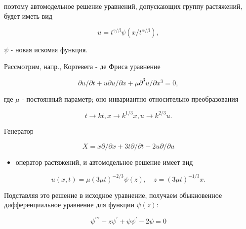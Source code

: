 \documentclass[10pt]{article}
\begin{document}
поэтому автомодельное решение уравнений, допускающих группу растяжений, будет иметь вид



\[

u=t^{\gamma / \beta} \psi\left(x / t^{\alpha / \beta}\right),

\]



$\psi$ - новая искомая функция.



Рассмотрим, напр., Кортевега - де Фриса уравнение



\[

\partial u / \partial t+u \partial u / \partial x+\mu \partial^{3} u / \partial x^{3}=0,

\]



где $\mu$ - постоянный параметр; оно инвариантно относительно преобразования



\[

t \rightarrow k t, x \rightarrow k^{1 / 3} x, u \rightarrow k^{2 / 3} u .

\]



Генератор



\[

X=x \partial / \partial x+3 t \partial / \partial t-2 u \partial / \partial u

\]



\begin{itemize}

  \item оператор растяжений, и автомодельное решение имеет вид

\end{itemize}



\[

u(x, t)=\mu(3 \mu t)^{-2 / 3} \psi(z), \quad z=(3 \mu t)^{-1 / 3} x .

\]



Подставляя это решение в исходное уравнение, получаем обыкновенное дифференциальное уравнение для функции $\psi(z):$



\[

\psi^{\prime \prime \prime}-z \psi^{\prime}+\psi \psi^{\prime}-2 \psi=0

\]
\end{document}
